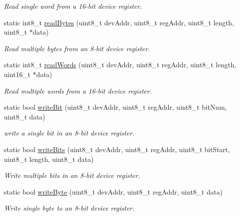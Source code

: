 \begin{DoxyCompactItemize}
\begin{DoxyCompactList}\small\item\em Read single word from a 16-\/bit device register. \end{DoxyCompactList}\item 
static int8\+\_\+t \mbox{\hyperlink{classI2Cdev_aada1b34c7fc381954d0398b7b5883c5a}{read\+Bytes}} (uint8\+\_\+t dev\+Addr, uint8\+\_\+t reg\+Addr, uint8\+\_\+t length, uint8\+\_\+t $\ast$data)
\begin{DoxyCompactList}\small\item\em Read multiple bytes from an 8-\/bit device register. \end{DoxyCompactList}\item 
static int8\+\_\+t \mbox{\hyperlink{classI2Cdev_a6e26c6e3fa9640d336cbcce4dc22e7f9}{read\+Words}} (uint8\+\_\+t dev\+Addr, uint8\+\_\+t reg\+Addr, uint8\+\_\+t length, uint16\+\_\+t $\ast$data)
\begin{DoxyCompactList}\small\item\em Read multiple words from a 16-\/bit device register. \end{DoxyCompactList}\item 
static bool \mbox{\hyperlink{classI2Cdev_aa68890af87de5471d32e583ebbd91acb}{write\+Bit}} (uint8\+\_\+t dev\+Addr, uint8\+\_\+t reg\+Addr, uint8\+\_\+t bit\+Num, uint8\+\_\+t data)
\begin{DoxyCompactList}\small\item\em write a single bit in an 8-\/bit device register. \end{DoxyCompactList}\item 
static bool \mbox{\hyperlink{classI2Cdev_a913371251b6a41520c080115650e1b59}{write\+Bits}} (uint8\+\_\+t dev\+Addr, uint8\+\_\+t reg\+Addr, uint8\+\_\+t bit\+Start, uint8\+\_\+t length, uint8\+\_\+t data)
\begin{DoxyCompactList}\small\item\em Write multiple bits in an 8-\/bit device register. \end{DoxyCompactList}\item 
static bool \mbox{\hyperlink{classI2Cdev_aeb297637ef985cd562da465ba61b7042}{write\+Byte}} (uint8\+\_\+t dev\+Addr, uint8\+\_\+t reg\+Addr, uint8\+\_\+t data)
\begin{DoxyCompactList}\small\item\em Write single byte to an 8-\/bit device register. \end{DoxyCompactList}\item 
\mbox{\label{classI2Cdev_acbe68a802d6a177301736e60bedd1def}} 

\end{DoxyCompactItemize}
